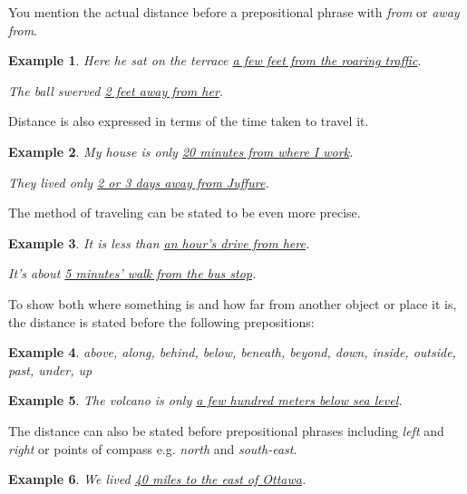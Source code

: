 \documentclass[oneside]{book}
\numberwithin{equation}{section}
\newtheorem{example}{Example}[section]
\begin{document}
%
You mention the actual distance before a prepositional phrase with \textit{from} or \textit{away from}.
\begin{example}
    Here he sat on the terrace \underline{a few feet from the roaring traffic}.
    
    The ball swerved \underline{2 feet away from her}.
\end{example}
Distance is also expressed in terms of the time taken to travel it.
\begin{example}
    My house is only \underline{20 minutes from where I work}.
    
    They lived only \underline{2 or 3 days away from Juffure}.
\end{example}
The method of traveling can be stated to be even more precise.
\begin{example}
    It is less than \underline{an hour's drive from here}.
    
    It's about \underline{5 minutes' walk from the bus stop}.
\end{example}
%
\noindent{} To show both where something is and how far from another object or place it is, the distance is stated before the following prepositions:
\begin{example}
    above, along, behind, below, beneath, beyond, down, inside, outside, past, under, up
\end{example}

\begin{example}
    The volcano is only \underline{a few hundred meters below sea level}.
\end{example}
The distance can also be stated before prepositional phrases including \textit{left} and \textit{right} or points of compass e.g. \textit{north} and \textit{south-east}.
\begin{example}
    We lived \underline{40 miles to the east of Ottawa}.
\end{example}
\end{document}
